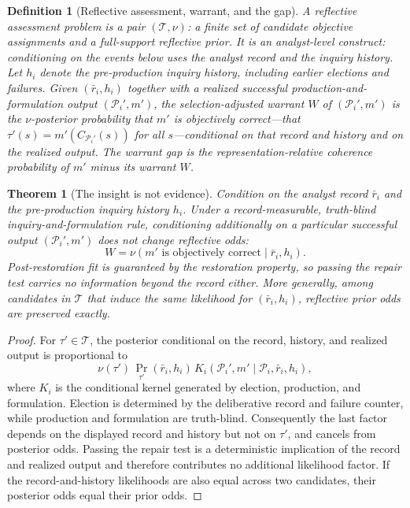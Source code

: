 \documentclass[11pt]{article}
\newtheorem{definition}[assumption]{Definition}
\newtheorem{theorem}[assumption]{Theorem}
\theoremstyle{definition}
\begin{document}
\begin{definition}[Reflective assessment, warrant, and the gap]
\label{def:warrant}
A reflective assessment problem is a pair $(\mathcal T,\nu)$: a finite set of candidate objective assignments and a full-support reflective prior.
It is an \emph{analyst-level} construct: conditioning on the events below uses the analyst record and the inquiry history.
Let $h_i$ denote the pre-production inquiry history, including earlier elections and failures.
Given $(\bar r_i,h_i)$ together with a realized successful production-and-formulation output $(\mathcal P_i',m')$, the \emph{selection-adjusted warrant} $W$ of $(\mathcal P_i',m')$ is the $\nu$-posterior probability that $m'$ is objectively correct---that $\tau'(s)=m'(C_{\mathcal P_i'}(s))$ for all $s$---conditional on that record \emph{and} history and on the realized output.
The \emph{warrant gap} is the representation-relative coherence probability of $m'$ minus its warrant $W$.
\end{definition}

\begin{theorem}[The insight is not evidence]
\label{thm:uninformative}
Condition on the analyst record $\bar r_i$ and the pre-production inquiry history $h_i$.
Under a record-measurable, truth-blind inquiry-and-formulation rule, conditioning additionally on a particular successful output $(\mathcal P_i',m')$ does not change reflective odds:
\[
W
=
\nu\!\left(
m'\text{ is objectively correct}
\mid \bar r_i,h_i
\right).
\]
Post-restoration fit is guaranteed by the restoration property, so passing the repair test carries no information beyond the record either.
More generally, among candidates in $\mathcal T$ that induce the same likelihood for $(\bar r_i,h_i)$, reflective prior odds are preserved exactly.
\end{theorem}

\begin{proof}
For $\tau'\in\mathcal T$, the posterior conditional on the record, history, and realized output is proportional to
\[
\nu(\tau')\,
\Pr_{\tau'}(\bar r_i,h_i)\,
K_i\!\left(
\mathcal P_i',m'
\mid\mathcal P_i,\bar r_i,h_i
\right),
\]
where $K_i$ is the conditional kernel generated by election, production, and formulation.
Election is determined by the deliberative record and failure counter, while production and formulation are truth-blind.
Consequently the last factor depends on the displayed record and history but not on $\tau'$, and cancels from posterior odds.
Passing the repair test is a deterministic implication of the record and realized output and therefore contributes no additional likelihood factor.
If the record-and-history likelihoods are also equal across two candidates, their posterior odds equal their prior odds.
\end{proof}
\end{document}
